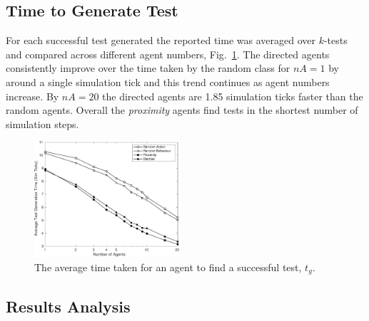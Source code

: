 \documentclass[letterpaper, 10 pt, journal, twoside]{IEEEtran}
\begin{document}
\subsection{Time to Generate Test}
For each successful test generated the reported time was averaged over $k$-tests and compared across different agent numbers, Fig.~\ref{Time}. 
%
The directed agents consistently improve over the time taken by the random class for $nA=1$ by around a single simulation tick and this trend continues as agent numbers increase. By $nA=20$ the directed agents are 1.85 simulation ticks faster than the random agents. Overall the \textit{proximity} agents find tests in the shortest number of simulation steps.

\begin{figure}[!t]
	\centering
\includegraphics[width=0.48\textwidth]{Time.pdf}
	\caption{The average time taken for an agent to find a successful test, $t_{g}$.}
	\label{Time}
\end{figure}




\subsection{Results Analysis}
\end{document}
